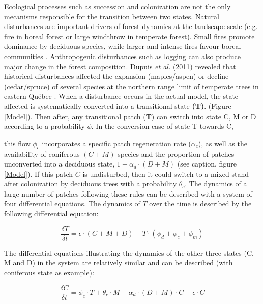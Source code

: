 Ecological processes such as succession and colonization are not the only
mecanisms responsible for the transition between two states. Natural
disturbances are important drivers of forest dynamics at the landscape scale
(e.g. fire in boreal forest or large windthrow in temperate forest). Small
fires promote dominance by deciduous species, while larger and intense fires
favour boreal communities \cite{Bergeron2004}. Anthropogenic disturbances such
as logging can also produce major change in the forest composition. Dupuis
\textit{et al.} (2011) revealed that historical disturbances affected the
expansion (maples/aspen) or decline (cedar/spruce) of several species at the
northern range limit of temperate trees in eastern Québec \cite{Dupuis2011}.
When a disturbance occurs in the actual model, the state affected is
systematically converted into a transitional state \textbf{(T)}. (Figure
\ref{Model}).  Then after, any transitional patch (\textbf{T}) can switch into
state C, M or D according to a probability $\phi$. In the conversion case of
state T towards C,


this flow $\phi_c$ incorporates a specific patch regeneration rate
($\alpha_c$), as well as the availability of coniferous $(C + M)$ species and
the proportion of patches unconverted into a deciduous state, $1- \alpha_d
\cdot (D + M)$ (see caption, figure \ref{Model}). If this patch $C$ is
undisturbed, then it could switch to a mixed stand after colonization by
deciduous trees with a probability $\theta_c$. The dynamics of a large number
of patches following these rules can be described with a system of four
differential equations. The dynamics of $T$ over the time is described by the
following differential equation:

\begin{equation}
 	\frac{\delta T}{\delta t} =\epsilon \cdot (C+M+D) - T \cdot (\phi_d + \phi_c + \phi_m)
\end{equation}

The differential equations illustrating the dynamics of the other three states
(C, M and D) in the system are relatively similar and can be described (with
coniferous state as example):

\begin{equation}
	\frac{\delta C}{\delta t} = \phi_c \cdot T + \theta_c \cdot M -\alpha_d \cdot (D+M)\cdot C - \epsilon \cdot C
\end{equation}

